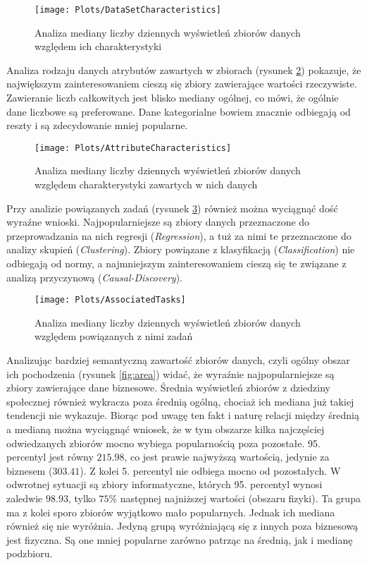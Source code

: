 \begin{figure}[ht]
  \texttt{[image: Plots/DataSetCharacteristics]}
  \caption{Analiza mediany liczby dziennych wyświetleń zbiorów danych względem ich charakterystyki}
  \label{fig:datasetcharacteristics}
\end{figure}

Analiza rodzaju danych atrybutów zawartych w zbiorach (rysunek \ref{fig:attributecharacteristics}) pokazuje, że największym zainteresowaniem cieszą się zbiory zawierające wartości rzeczywiste.
Zawieranie liczb całkowitych jest blisko mediany ogólnej, co mówi, że ogólnie dane liczbowe są preferowane.
Dane kategorialne bowiem znacznie odbiegają od reszty i są zdecydowanie mniej popularne.

\begin{figure}[ht]
  \texttt{[image: Plots/AttributeCharacteristics]}
  \caption{Analiza mediany liczby dziennych wyświetleń zbiorów danych względem charakterystyki zawartych w nich danych}
  \label{fig:attributecharacteristics}
\end{figure}

Przy analizie powiązanych zadań (rysunek \ref{fig:associatedtasks}) również można wyciągnąć dość wyraźne wnioski.
Najpopularniejsze są zbiory danych przeznaczone do przeprowadzania na nich regresji (\emph{Regression}), a tuż za nimi te przeznaczone do analizy skupień (\emph{Clustering}).
Zbiory powiązane z klasyfikacją (\emph{Classification}) nie odbiegają od normy, a najmniejszym zainteresowaniem cieszą się te związane z analizą przyczynową (\emph{Causal-Discovery}).

\begin{figure}[ht]
  \texttt{[image: Plots/AssociatedTasks]}
  \caption{Analiza mediany liczby dziennych wyświetleń zbiorów danych względem powiązanych z nimi zadań}
  \label{fig:associatedtasks}
\end{figure}

Analizując bardziej semantyczną zawartość zbiorów danych, czyli ogólny obszar ich pochodzenia (rysunek \ref{fig:area}) widać, że wyraźnie najpopularniejsze są zbiory zawierające dane biznesowe.
Średnia wyświetleń zbiorów z dziedziny społecznej również wykracza poza średnią ogólną, chociaż ich mediana już takiej tendencji nie wykazuje.
Biorąc pod uwagę ten fakt i naturę relacji między średnią a medianą można wyciągnąć wniosek, że w tym obszarze kilka najczęściej odwiedzanych zbiorów mocno wybiega popularnością poza pozostałe.
95. percentyl jest równy \(215.98\), co jest prawie najwyższą wartością, jedynie za biznesem (\(303.41\)).
Z kolei 5. percentyl nie odbiega mocno od pozostałych.
W odwrotnej sytuacji są zbiory informatyczne, których 95. percentyl wynosi zaledwie \(98.93\), tylko \(75\%\) następnej najniższej wartości (obszaru fizyki).
Ta grupa ma z kolei sporo zbiorów wyjątkowo mało popularnych.
Jednak ich mediana również się nie wyróżnia.
Jedyną grupą wyróżniającą się z innych poza biznesową jest fizyczna.
Są one mniej popularne zarówno patrząc na średnią, jak i medianę podzbioru.

